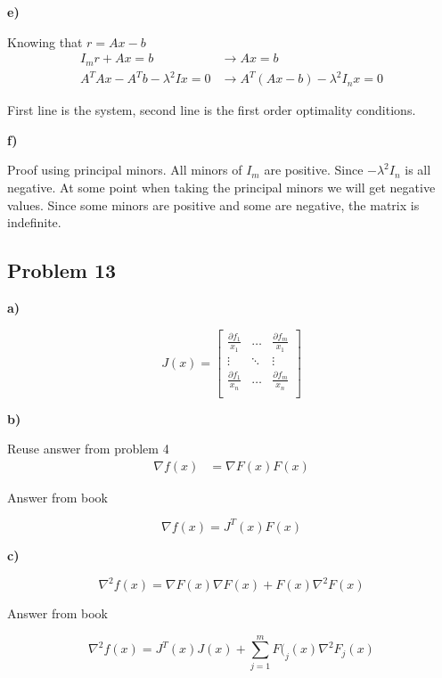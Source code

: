 \textbf{e)}

\answer

Knowing that $r = Ax - b$
\begin{align*}
	I_m r + Ax = b &\rightarrow Ax = b \\
	A^T Ax - A^T b - \lambda^2 I x = 0 &\rightarrow A^T(Ax-b) - \lambda^2I_nx = 0
\end{align*}

First line is the system, second line is the first order optimality conditions.

\textbf{f)}

\answer

Proof using principal minors. All minors of $I_m$ are positive. Since $-\lambda^2 I_n$ is all negative. At some point when taking the principal minors we will get negative values. Since some minors are positive and some are negative, the matrix is indefinite.

\subsection{Problem 13}

\textbf{a)}

\answer

\[
J(x) = \begin{bmatrix}
	\frac{\partial f_1}{x_1} & \ldots & \frac{\partial f_m}{x_1} \\
	\vdots & \ddots & \vdots \\
	\frac{\partial f_1}{x_n} & \ldots & \frac{\partial f_m}{x_n} \\
\end{bmatrix}
\]

\textbf{b)}

\answer

Reuse answer from problem 4
\begin{align*}
	\nabla f(x) &= \nabla F(x)F(x)
\end{align*}

\color{red}
Answer from book

\[
	\nabla f(x) = J^T(x) F(x)
\]

\color{black}

\textbf{c)}

\answer

\[
	\nabla^2 f(x) = \nabla F(x) \nabla F(x) + F(x) \nabla^2F(x)
\]

\color{red}
Answer from book

\[
	\nabla^2 f(x) = J^T(x) J(x) + \sum_{j=1}^m F(_j(x) \nabla^2 F_j(x)
\]

